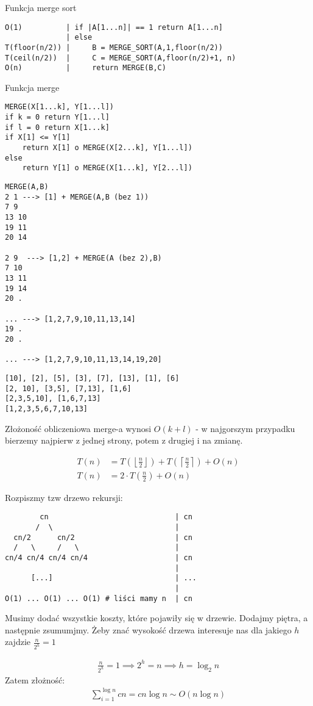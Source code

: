 \documentclass{article}
\begin{document}
\newpage

\noindent
Funkcja merge sort
\begin{verbatim}
O(1)          | if |A[1...n]| == 1 return A[1...n]
              | else
T(floor(n/2)) |     B = MERGE_SORT(A,1,floor(n/2))
T(ceil(n/2))  |     C = MERGE_SORT(A,floor(n/2)+1, n)
O(n)          |     return MERGE(B,C)
\end{verbatim}

\noindent
Funkcja merge
\begin{verbatim}
MERGE(X[1...k], Y[1...l])
if k = 0 return Y[1...l]
if l = 0 return X[1...k]
if X[1] <= Y[1]
    return X[1] o MERGE(X[2...k], Y[1...l])
else   
    return Y[1] o MERGE(X[1...k], Y[2...l])
\end{verbatim}

\begin{verbatim}
MERGE(A,B)
2 1 ---> [1] + MERGE(A,B (bez 1))
7 9
13 10
19 11
20 14
  
2 9  ---> [1,2] + MERGE(A (bez 2),B)
7 10
13 11
19 14
20 .

... ---> [1,2,7,9,10,11,13,14]
19 .
20 .

... ---> [1,2,7,9,10,11,13,14,19,20]
\end{verbatim}

\begin{verbatim}
[10], [2], [5], [3], [7], [13], [1], [6]
[2, 10], [3,5], [7,13], [1,6]
[2,3,5,10], [1,6,7,13]
[1,2,3,5,6,7,10,13]
\end{verbatim}

\noindent
Złożoność obliczeniowa merge-a wynosi $O(k+l)$ - w najgorszym przypadku bierzemy najpierw z jednej strony, potem z drugiej i na zmianę.

\begin{align}
    T(n) &= T\left(\left\lfloor \frac{n}{2} \right\rfloor\right) + T\left(\left\lceil \frac{n}{2} \right\rceil\right) + O(n)\\
    T(n) &= 2\cdot T\left(\frac{n}{2}\right) + O(n)
\end{align}

\newpage

\noindent
Rozpiszmy tzw drzewo rekursji:

\begin{verbatim}
        cn                             | cn
       /  \                            |
  cn/2      cn/2                       | cn
  /   \     /   \                      |
cn/4 cn/4 cn/4 cn/4                    | cn
                                       |
      [...]                            | ...
                                       |
O(1) ... O(1) ... O(1) # liści mamy n  | cn
\end{verbatim}

\noindent
Musimy dodać wszystkie koszty, które pojawiły się w drzewie. Dodajmy piętra, a następnie zsumumjmy. 
Żeby znać wysokość drzewa interesuje nas dla jakiego $h$ zajdzie $\frac{n}{2^h} = 1$

\begin{align}
    \frac{n}{2^h} = 1 \implies 2^h = n \implies h = \log_2 n
\end{align}
Zatem złożność:
\begin{align}
    \sum_{i=1}^{\log n} cn = cn\log n \sim O(n\log n)
\end{align}
\end{document}
